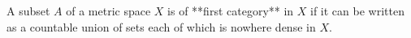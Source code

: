 A subset $A$ of a metric space $X$ is of **first category** in $X$ if it can be written as a countable union of sets each of which is nowhere dense in $X$.
